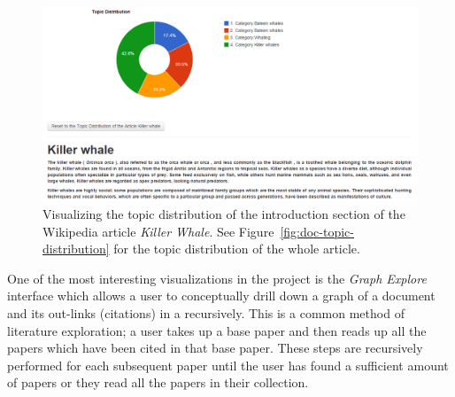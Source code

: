 \begin{figure}[htb]\centering 
\includegraphics[width=1\textwidth]{images/para_topic_distribution.png}
\caption{Visualizing the topic distribution of the introduction 
section of the Wikipedia article \textit{Killer Whale}. See Figure~\ref{fig:doc-topic-distribution} for the topic distribution of 
the whole article.}
\label{fig:doc-para-viz}
\end{figure}


One of the most interesting visualizations in the project is the 
\textsl{Graph Explore} interface which allows a user to conceptually 
drill down a graph of a document and its out-links (citations) in a 
recursively.
This is a common method of literature exploration; a user takes up a base paper and then reads up all the papers which have been cited in that base paper.
These steps are recursively performed for each subsequent paper until the user has found a sufficient amount of papers or they read all the papers in their collection.


